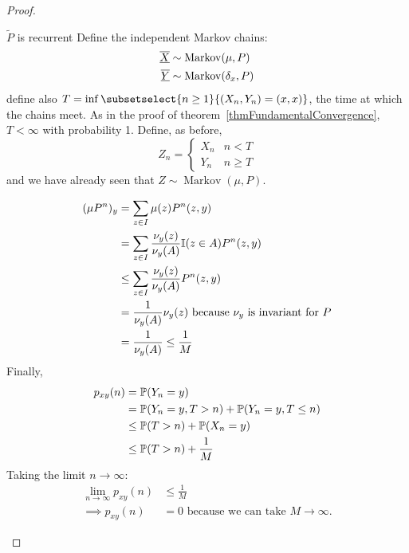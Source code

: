 \documentclass[../Main.tex]{subfiles}
\begin{document}
\begin{proof}
\begin{case}{$\tilde{P}$ is recurrent}
        Define the independent Markov chains:
        \begin{align*}
            \chain{X} &\sim \operatorname{Markov}(\mu, P) \\
            \chain{Y} &\sim \operatorname{Markov}(\delta_x, P)
        \end{align*}
        define also $T = \inf\subsetselect{n \geq 1}{(X_n, Y_n) = (x, x)}$, the time at which the chains meet. As in the proof of theorem~\ref{thmFundamentalConvergence}, $T < \infty$ with probability 1. Define, as before,
        \begin{equation*}
            Z_n = \begin{cases}
                X_n & n < T \\
                Y_n & n \geq T
            \end{cases}
        \end{equation*}
        and we have already seen that $Z \sim \operatorname{Markov}(\mu, P)$.

        \begin{align*}
            (\mu P^n)_y &= \sum_{z \in I} \mu(z) P^n(z, y) \\
            &= \sum_{z \in I} \frac{\nu_y(z)}{\nu_y(A)} \ind{z \in A} P^n(z, y) \\
            &\leq \sum_{z \in I} \frac{\nu_y(z)}{\nu_y(A)} P^n(z, y) \\
            &= \frac{1}{\nu_y(A)} \nu_y(z) \text{ because $\nu_y$ is invariant for $P$} \\
            &= \frac{1}{\nu_y(A)} \leq \frac{1}{M}
        \end{align*}
        Finally, 
        \begin{align*}
            p_{xy}(n) & = \P(Y_n = y) \\
            &= \P(Y_n = y, T > n) + \P(Y_n = y, T \leq n) \\
            &\leq \P(T > n) + \P(X_n = y) \\
            &\leq \P(T > n) + \frac{1}{M}
        \end{align*}
        Taking the limit $n \to \infty$:
        \begin{align*}
            \lim_{n \to \infty} p_{xy}(n) &\leq \frac{1}{M} \\
            \implies p_{xy}(n) &= 0 \text{ because we can take $M \to \infty$.}
        \end{align*}
    \end{case}
\end{proof}
\end{document}
